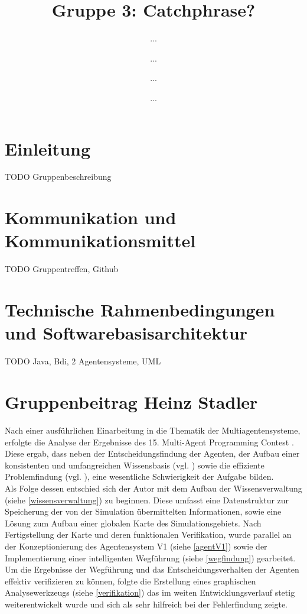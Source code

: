 \documentclass[runningheads]{llncs}
\begin{document}
%
\title{Gruppe 3: Catchphrase?}
%
%
\author{...\and
...\and
...\and
...}
%
%
%
\maketitle              %
%
%
\section{Einleitung}
TODO Gruppenbeschreibung
\section{Kommunikation und Kommunikationsmittel}
TODO Gruppentreffen, Github

\section{Technische Rahmenbedingungen und Softwarebasisarchitektur}
TODO Java, Bdi, 2 Agentensysteme, UML

\section{Gruppenbeitrag Heinz Stadler}
Nach einer ausführlichen Einarbeitung in die Thematik der Multiagentensysteme, erfolgte die Analyse der Ergebnisse des 15. Multi-Agent Programming Contest \cite{Ahlbrecht2021}. Diese ergab, dass neben der Entscheidungsfindung der Agenten, der Aufbau einer konsistenten und umfangreichen Wissensbasis (vgl. \cite[S. 29]{Ahlbrecht2021}) sowie die effiziente Problemfindung (vgl. \cite[S. 17]{Ahlbrecht2021}), eine wesentliche Schwierigkeit der Aufgabe bilden. \\
Als Folge dessen entschied sich der Autor mit dem Aufbau der Wissensverwaltung (siehe \ref{wissensverwaltung}) zu beginnen. Diese umfasst eine Datenstruktur zur Speicherung der von der Simulation übermittelten Informationen, sowie eine Lösung zum Aufbau einer globalen Karte des Simulationsgebiets. Nach Fertigstellung der Karte und deren funktionalen Verifikation, wurde parallel an der Konzeptionierung des Agentensystem V1 (siehe \ref{agentV1}) sowie der Implementierung einer intelligenten Wegführung (siehe \ref{wegfindung}) gearbeitet. Um die Ergebnisse der Wegführung und das Entscheidungsverhalten der Agenten effektiv verifizieren zu können, folgte die Erstellung eines graphischen Analysewerkzeugs (siehe \ref{verifikation}) das im weiten Entwicklungsverlauf stetig weiterentwickelt wurde und sich als sehr hilfreich bei der Fehlerfindung zeigte.
 
\end{document}
